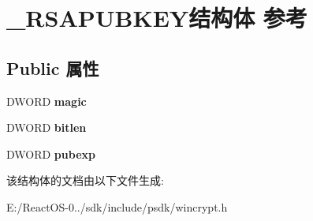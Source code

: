 \hypertarget{struct___r_s_a_p_u_b_k_e_y}{}\section{\+\_\+\+R\+S\+A\+P\+U\+B\+K\+E\+Y结构体 参考}
\label{struct___r_s_a_p_u_b_k_e_y}
\subsection*{Public 属性}
\begin{DoxyCompactItemize}
\item 
\mbox{\label{struct___r_s_a_p_u_b_k_e_y_a6480fa9830cdf1a226f6edc893e78307}} 
D\+W\+O\+RD {\bfseries magic}
\item 
\mbox{\label{struct___r_s_a_p_u_b_k_e_y_a1f0713427de7ca11b8c2c88d3298f896}} 
D\+W\+O\+RD {\bfseries bitlen}
\item 
\mbox{\label{struct___r_s_a_p_u_b_k_e_y_a0aa55859e317f237d94b4d06c13ec84d}} 
D\+W\+O\+RD {\bfseries pubexp}
\end{DoxyCompactItemize}


该结构体的文档由以下文件生成\+:\begin{DoxyCompactItemize}
\item 
E\+:/\+React\+O\+S-\/0../sdk/include/psdk/wincrypt.\+h\end{DoxyCompactItemize}
